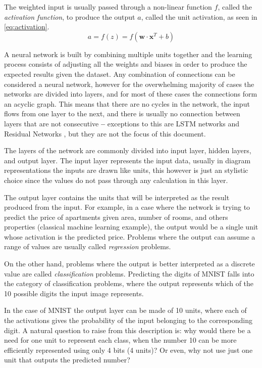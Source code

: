 The weighted input is usually passed through a non-linear function $f$, called the \textit{activation function}, to produce the output $a$, called the unit activation, as seen in \autoref{eq:activation}.
\begin{equation} \label{eq:activation}
    a = f\left(z\right) = f\left(\bm{w} \cdot \bm{x}^T + b\right)
\end{equation}

A neural network is built by combining multiple units together and the learning process consists of adjusting all the weights and biases in order to produce the expected results given the dataset. Any combination of connections can be considered a neural network, however for the overwhelming majority of cases the networks are divided into layers, and for most of these cases the connections form an acyclic graph. This means that there are no cycles in the network, the input flows from one layer to the next, and there is usually no connection between layers that are not consecutive \textbf{--} exceptions to this are \gls{LSTM} networks \cite{lstm1997} and Residual Networks \cite{resnet2015}, but they are not the focus of this document.

The layers of the network are commonly divided into input layer, hidden layers, and output layer. The input layer represents the input data, usually in diagram representations the inputs are drawn like units, this however is just an stylistic choice since the values do not pass through any calculation in this layer.

The output layer contains the units that will be interpreted as the result produced from the input. For example, in a case where the network is trying to predict the price of apartments given area, number of rooms, and others properties (classical machine learning example), the output would be a single unit whose activation is the predicted price. Problems where the output can assume a range of values are usually called \textit{regression} problems.

On the other hand, problems where the output is better interpreted as a discrete value are called \textit{classification} problems. Predicting the digits of \gls{MNIST} falls into the category of classification problems, where the output represents which of the 10 possible digits the input image represents.

In the case of \gls{MNIST} the output layer can be made of 10 units, where each of the activations gives the probability of the input belonging to the corresponding digit. A natural question to raise from this description is: why would there be a need for one unit to represent each class, when the number 10 can be more efficiently represented using only 4 bits (4 units)? Or even, why not use just one unit that outputs the predicted number?

